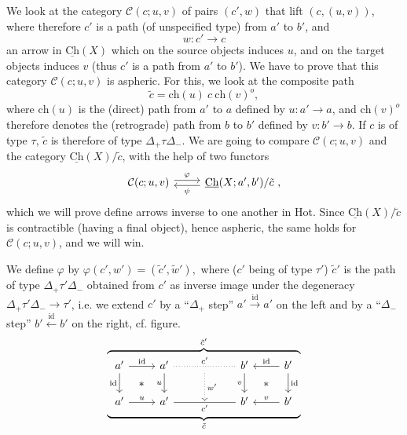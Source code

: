 \documentclass[11pt]{article}
\newcommand{\printedpage}[1]{\marginpar{\footnotesize p.~#1}}
\newcommand{\msp}[1]{\marginpar{\footnotesize [#1]}}
\newcommand{\Ch}{\underline{\mathrm{Ch}}}
\newcommand{\cC}{\mathcal{C}}
\begin{document}
We look at the category $\cC(c;u,v)$ of pairs $(c',w)$ that lift $(c,(u,v))$, where therefore $c'$ is a path (of unspecified type) from $a'$ to $b'$, and
\[
w : c' \longrightarrow c
\]
an arrow in $\Ch(X)$ which on the source objects induces $u$, and on the target objects induces $v$ (thus $c'$ is a path from $a'$ to $b'$). We have to
\printedpage{101}
\msp{page 162}
prove that this category $\cC(c;u,v)$ is aspheric. For this, we look at the composite path
\[
\tilde{c} = \mathrm{ch}(u)\ c\ \mathrm{ch}(v)^{o},
\]
where $\mathrm{ch}(u)$ is the (direct) path from $a'$ to $a$ defined by $u : a' \longrightarrow a$, and $\mathrm{ch}(v)^{o}$ therefore denotes the (retrograde) path from $b$ to $b'$ defined by $v : b' \longrightarrow b$. If $c$ is of type $\tau$, $\tilde{c}$ is therefore of type $\Delta_{+}\tau\Delta_{-}$. We are going to compare $\cC(c;u,v)$ and the category $\Ch(X)/\tilde{c}$, with the help of two functors
\[
\begin{tikzcd}
\cC(c;u,v) \ar[r,shift left,"\varphi"] & \Ch(X;a',b')/\tilde{c}\ , \ar[l,shift left,"\psi"]
\end{tikzcd}
\]
which we will prove define arrows inverse to one another in Hot. Since $\Ch(X)/\tilde{c}$ is contractible (having a final object), hence aspheric, the same holds for $\cC(c;u,v)$, and we will win.

We define $\varphi$ by $\boxed{\varphi(c',w') = (\tilde{c}',\tilde{w}'),}$ where ($c'$ being of type $\tau'$) $\tilde{c}'$ is the path of type $\Delta_{+}\tau'\Delta_{-}$ obtained from $c'$ as inverse image under the degeneracy $\Delta_{+}\tau'\Delta_{-} \longrightarrow \tau'$, i.e. we extend $c'$ by a ``$\Delta_{+}$ step'' $a' \xrightarrow{\mathrm{id}} a'$ on the left and by a ``$\Delta_{-}$ step'' $b' \xleftarrow{\mathrm{id}} b'$ on the right, cf. figure.
\[
\overbrace{\underbrace{\begin{tikzcd}[ampersand replacement=\&]
a' \ar[r,"\mathrm{id}"] \ar[d,"\mathrm{id}"'] \ar[dr,phantom,"\ast"] \& a' \ar[rr,dotted,no head,"c'"] \ar[d,"u"'] \& {} \ar[d,dotted,"w'"] \& b' \ar[d,"v"'] \ar[dr,phantom,"\ast"] \& b' \ar[l,"\mathrm{id}"'] \ar[d,"\mathrm{id}"] \\
a' \ar[r,"u"] \& a' \ar[rr,no head,"c'"'] \& {} \& b' \& b' \ar[l,"v"'] %
\end{tikzcd}}_{\tilde{c}}}^{\tilde{c}'}
\]
\end{document}
